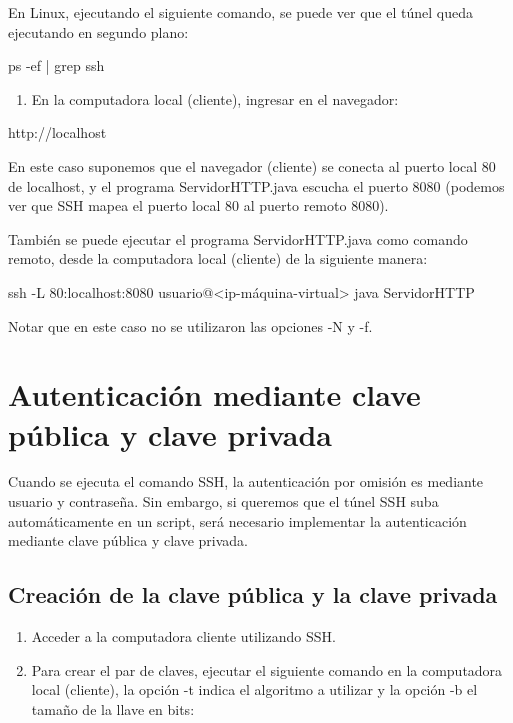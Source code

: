 \documentclass[11pt,a4paper,oneside]{book}
\begin{document}
En Linux, ejecutando el siguiente comando, se puede ver que el túnel queda ejecutando en segundo plano:

\begin{SourceCode}
ps -ef | grep ssh
\end{SourceCode}

\begin{enumerate}

\item En la computadora local (cliente), ingresar en el navegador:

\end{enumerate}

\begin{SourceCode}
http://localhost
\end{SourceCode}

En este caso suponemos que el navegador (cliente) se conecta al puerto local 80 de localhost, y el programa ServidorHTTP.java escucha el puerto 8080 (podemos ver que SSH mapea el puerto local 80 al puerto remoto 8080).

También se puede ejecutar el programa ServidorHTTP.java como comando remoto, desde la computadora local (cliente) de la siguiente manera:

\begin{SourceCode}
ssh -L 80:localhost:8080 usuario@<ip-máquina-virtual> java ServidorHTTP
\end{SourceCode}

Notar que en este caso no se utilizaron las opciones -N y -f.

\section{Autenticación mediante clave pública y clave privada}

Cuando se ejecuta el comando SSH, la autenticación por omisión es mediante usuario y contraseña. Sin embargo, si queremos que el túnel SSH suba automáticamente en un script, será necesario implementar la autenticación mediante clave pública y clave privada.

\subsection{Creación de la clave pública y la clave privada}

\begin{enumerate}

\item Acceder a la computadora cliente utilizando SSH.

\item Para crear el par de claves, ejecutar el siguiente comando en la computadora local (cliente), la opción -t indica el algoritmo a utilizar y la opción -b el tamaño de la llave en bits:

\end{enumerate}
\end{document}
